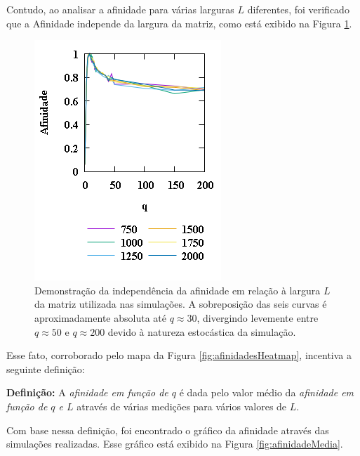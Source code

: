 \documentclass[11pt,a4paper,twocolumn,final]{article}
\begin{document}
Contudo, ao analisar a afinidade para várias larguras $L$ diferentes, foi verificado que a Afinidade independe da largura da matriz, como está exibido na Figura \ref{fig:afinidadesQ0a200L750a2000}.
\begin{figure}
    \centering
    \includegraphics[width=.9\linewidth]{afinidadesQ0a200L750a2000.png}
    \caption{Demonstração da independência da afinidade em relação à largura $L$ da matriz utilizada nas simulações. A sobreposição das seis curvas é aproximadamente absoluta até $q\approx 30$, divergindo levemente entre $q\approx 50$ e $q\approx 200$ devido à natureza estocástica da simulação.}
    \label{fig:afinidadesQ0a200L750a2000}
\end{figure}
Esse fato, corroborado pelo mapa da Figura \ref{fig:afinidadesHeatmap},
incentiva a seguinte definição:

\textbf{Definição:} A \textit{afinidade em função de $q$} é dada pelo valor médio da \textit{afinidade em função de $q$ e $L$} através de várias medições para vários valores de $L$.

Com base nessa definição, foi encontrado o gráfico da afinidade através das simulações realizadas. Esse gráfico está exibido na Figura \ref{fig:afinidadeMedia}.
\end{document}
